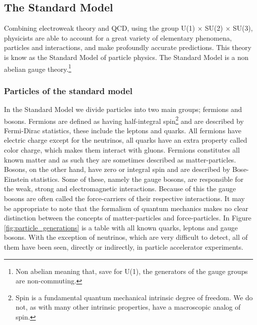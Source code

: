 \subsection{The Standard Model}
Combining electroweak theory and QCD, using the group U(1) $\times$ SU(2) $\times$ SU(3), physicists are able to account for a great variety of elementary phenomena, particles and interactions, and make profoundly accurate predictions. This theory is know as the Standard Model of particle physics. The Standard Model is a non abelian gauge theory.\footnote{Non abelian meaning that, save for U(1), the generators of the gauge groups are non-commuting.}

\subsubsection{Particles of the standard model} \label{sec:particles}


In the Standard Model we divide particles into two main groups; fermions and bosons. Fermions are defined as having half-integral spin\footnote{Spin is a fundamental quantum mechanical intrinsic degree of freedom. We do not, as with many other intrinsic properties, have a macroscopic analog of spin.} and are described by Fermi-Dirac statistics, these include the leptons and quarks. All fermions have electric charge except for the neutrinos, all quarks have an extra property called color charge, which makes them interact with gluons. Fermions constitutes all known matter and as such they are sometimes described as matter-particles. Bosons, on the other hand, have zero or integral spin and are described by Bose-Einstein statistics. Some of these, namely the gauge bosons, are responsible for the weak, strong and electromagnetic interactions. Because of this the gauge bosons are often called the force-carriers of their respective interactions. It may be appropriate to note that the formalism of quantum mechanics makes no clear distinction between the concepts of matter-particles and force-particles. In Figure \ref{fig:particle_generations} is a table with all known quarks, leptons and gauge bosons. With the exception of neutrinos, which are very difficult to detect, all of them have been seen, directly or indirectly, in particle accelerator experiments.

